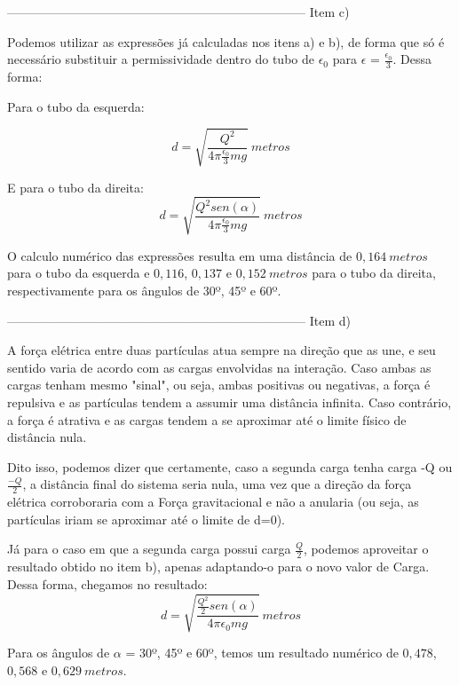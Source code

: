 \documentclass[journal,comsoc]{IEEEtran}
\begin{document}
------------------------------------------------------------------------
Item c)

\par Podemos utilizar as expressões já calculadas nos itens a) e b), de forma que só é necessário substituir a permissividade dentro do tubo de ${\epsilon}_{0}$ para $\epsilon$ = $\frac{{\epsilon}_{0}}{3}$. Dessa forma:
\par Para o tubo da esquerda:

    \begin{equation}
    	d = \sqrt{\frac{Q^2}{4\pi\frac{{\epsilon}_{0}}{3}mg}}\ metros
    \end{equation}
\par E para o tubo da direita:
    \begin{equation}
    	d = \sqrt{\frac{Q^2sen(\alpha)}{4\pi\frac{{\epsilon}_{0}}{3}mg}}\ metros
    \end{equation}
\par O calculo numérico das expressões resulta em uma distância de $0,164\ metros$ para o tubo da esquerda e $0,116$, $0,137$ e $0,152\ metros$ para o tubo da direita, respectivamente para os ângulos de 30º, 45º e 60º.

------------------------------------------------------------------------
Item d)
\par A força elétrica entre duas partículas atua sempre na direção que as une, e seu sentido varia de acordo com as cargas envolvidas na interação. Caso ambas as cargas tenham mesmo "sinal", ou seja, ambas positivas ou negativas, a força é repulsiva e as partículas tendem a assumir uma distância infinita. Caso contrário, a força é atrativa e as cargas tendem a se aproximar até o limite físico de distância nula.
\par Dito isso, podemos dizer que certamente, caso a segunda carga tenha carga -Q ou $\frac{-Q}{2}$, a distância final do sistema seria nula, uma vez que a direção da força elétrica corroboraria com a Força gravitacional e não a anularia (ou seja, as partículas iriam se aproximar até o limite de d=0).
\par Já para o caso em que a segunda carga possui carga $\frac{Q}{2}$, podemos aproveitar o resultado obtido no item b), apenas adaptando-o para o novo valor de Carga. Dessa forma, chegamos no resultado:
\begin{equation}
    	d = \sqrt{\frac{\frac{Q^2}{2}sen(\alpha)}{4\pi{\epsilon}_{0}mg}}\ metros
\end{equation}
\par Para os ângulos de $\alpha$ = 30º, 45º e 60º, temos um resultado numérico de $0,478$, $0,568$ e $0,629\ metros$.
\end{document}
